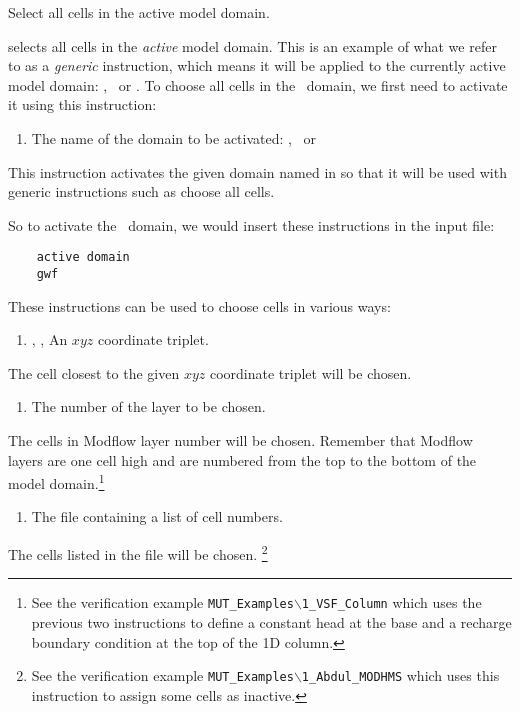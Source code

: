 {
    {Select all cells in the active model domain.
     }

selects all cells in the {\em active} model domain.  This is an example of what we refer to as a {\em generic} instruction, which means it will be applied to the currently active model domain: \gwf, \swf\ or \cln.  To choose all cells in the \gwf\ domain, we first need to activate it using this instruction:

    {
        \squish
        \begin{enumerate}
        \item {}  The name of the domain to be activated: \gwf, \swf\ or \cln\
        \end{enumerate}
        This instruction activates the given domain named in   so that it will be used with generic instructions such as \textsf{choose all cells}.
    }

So to activate the \gwf\ domain, we would insert these instructions in the input file:
\begin{verbatim}
    active domain
    gwf
\end{verbatim}

These instructions can be used to choose cells in various ways\label{page:cellSelect}:

    {
        \squish
        \begin{enumerate}
        \item {}, ,   An $xyz$ coordinate triplet.
        \end{enumerate}
        The cell closest to the given $xyz$ coordinate triplet will be chosen.
    }

    {
        \squish
        \begin{enumerate}
        \item {}  The number of the layer to be chosen.
        \end{enumerate}
        The cells in Modflow layer number  will be chosen.  Remember that Modflow layers are one cell high and are numbered from the top to the bottom of the model domain.\footnote{ See the verification example \texttt{MUT\_Examples$\backslash$1\_VSF\_Column} which uses the previous two instructions to define a constant head at  the base  and a recharge boundary condition at the top of the 1D column.}
    }

    {
        \squish
        \begin{enumerate}
        \item {}  The file  containing a list of cell numbers.
        \end{enumerate}
        The cells listed in the file  will be chosen.  \footnote{ See the verification example \texttt{MUT\_Examples$\backslash$1\_Abdul\_MODHMS} which uses this instruction to assign some cells as inactive.}
    }

}
